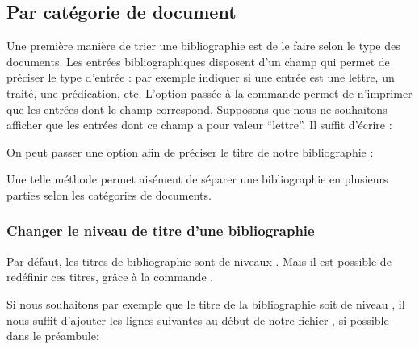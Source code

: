\subsection{Par catégorie de document}
Une première manière de trier une bibliographie est de le faire selon le type des documents. Les entrées bibliographiques disposent d'un champ  qui permet de préciser le type d'entrée : par exemple indiquer si une entrée est une lettre, un traité, une prédication, etc. L'option  passée à la commande  permet de n'imprimer que les entrées dont le champ  correspond. Supposons que nous ne souhaitons afficher que les entrées dont ce champ  a pour valeur \enquote{lettre}. Il suffit d'écrire :

\begin{latexcode}
\printbibliography[subtype=lettre]
\end{latexcode}

On peut passer une option  afin de préciser le titre de notre bibliographie :

\begin{latexcode}
\printbibliography[subtype=lettre,title=Lettres]
\end{latexcode}

Une telle méthode permet aisément de séparer une bibliographie en plusieurs parties selon les catégories de documents.

\begin{latexcode}
\printbibliography[subtype=concile,title=Actes de conciles]
\printbibliography[subtype=traite,title=Traités]
\printbibliography[subtype=lettre,title=Lettres]
\end{latexcode}


\subsubsection{Changer le niveau de titre d'une bibliographie}

Par défaut, les titres de bibliographie sont de niveaux . Mais il est possible de redéfinir ces titres, grâce à la commande .

Si nous souhaitons par exemple que le titre de la bibliographie soit de niveau , il nous suffit d'ajouter les lignes suivantes au début de notre fichier , si possible dans le préambule:


